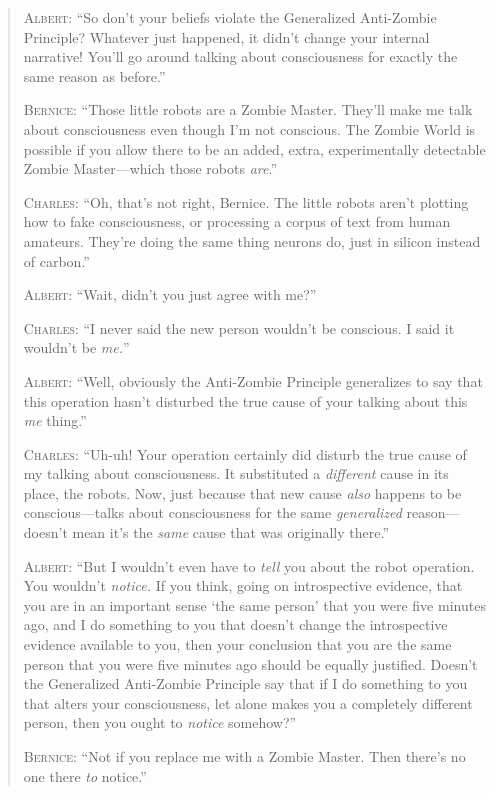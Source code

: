 \begin{quotation}
{
 \textsc{Albert}: ``So don't your beliefs
violate the Generalized Anti-Zombie Principle? Whatever just happened,
it didn't change your internal narrative!
You'll go around talking about consciousness for
exactly the same reason as before.''}

{
 \textsc{Bernice}: ``Those little robots are a Zombie
Master. They'll make me talk about consciousness even
though I'm not conscious. The Zombie World is possible
if you allow there to be an added, extra, experimentally detectable
Zombie Master---which those robots \textit{are}.''}

{
 \textsc{Charles}: ``Oh, that's not right,
Bernice. The little robots aren't plotting how to fake
consciousness, or processing a corpus of text from human amateurs.
They're doing the same thing neurons do, just in
silicon instead of carbon.''}

{
 \textsc{Albert}: ``Wait, didn't you just
agree with me?''}

{
 \textsc{Charles}: ``I never said the new person
wouldn't be conscious. I said it
wouldn't be \textit{me.}''}

{
 \textsc{Albert}: ``Well, obviously the Anti-Zombie
Principle generalizes to say that this operation hasn't
disturbed the true cause of your talking about this \textit{me}
thing.''}

{
 \textsc{Charles}: ``Uh-uh! Your operation certainly did
disturb the true cause of my talking about consciousness. It
substituted a \textit{different} cause in its place, the robots. Now,
just because that new cause \textit{also} happens to be
conscious---talks about consciousness for the same \textit{generalized}
reason---doesn't mean it's the
\textit{same} cause that was originally there.''}

{
 \textsc{Albert}: ``But I wouldn't even
have to \textit{tell} you about the robot operation. You
wouldn't \textit{notice.} If you think, going on
introspective evidence, that you are in an important sense
`the same person' that you were five
minutes ago, and I do something to you that doesn't
change the introspective evidence available to you, then your
conclusion that you are the same person that you were five minutes ago
should be equally justified. Doesn't the Generalized
Anti-Zombie Principle say that if I do something to you that alters
your consciousness, let alone makes you a completely different person,
then you ought to \textit{notice} somehow?''}

{
 \textsc{Bernice}: ``Not if you replace me with a Zombie
Master. Then there's no one there \textit{to}
notice.''}


\end{quotation}
